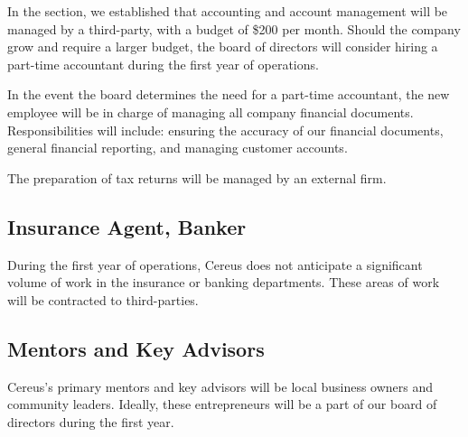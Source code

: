 In the  section, we established that accounting and account management will be managed by a third-party, with a budget of \$200 per month. Should the company grow and require a larger budget, the board of directors will consider hiring a part-time accountant during the first year of operations.

In the event the board determines the need for a part-time accountant, the new employee will be in charge of managing all company financial documents. Responsibilities will include: ensuring the accuracy of our financial documents, general financial reporting, and managing customer accounts.

The preparation of tax returns will be managed by an external firm.

\subsection{Insurance Agent, Banker}

During the first year of operations, Cereus does not anticipate a significant volume of work in the insurance or banking departments. These areas of work will be contracted to third-parties.

\subsection{Mentors and Key Advisors}

Cereus's primary mentors and key advisors will be local business owners and community leaders. Ideally, these entrepreneurs will be a part of our board of directors during the first year.